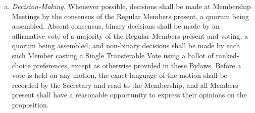 \begin{enumerate}[a.]
  (50\%) of the total Regular Membership, as determined by the
  Secretary of the Corporation.
\item \emph{Decision-Making.} Whenever possible, decisions shall be made
at Membership Meetings by the consensus of the Regular Members
present, a quorum being assembled. Absent consensus, binary decisions
shall be made by an affirmative vote of a majority of the Regular
Members present and voting, a quorum being assembled, and non-binary
decisions shall be made by each such Member casting a Single
Transferable Vote using a ballot of ranked-choice preferences, except
as otherwise provided in these Bylaws. Before a vote is held on any
motion, the exact language of the motion shall be recorded by the
Secretary and read to the Membership, and all Members present shall
have a reasonable opportunity to express their opinions on the
proposition.
\end{enumerate}
